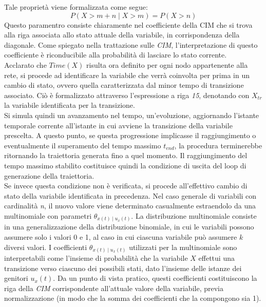   Tale proprietà viene formalizzata come segue:
  \begin{equation}
    P(X > m + n \; | \; X > m) = P(X > n)  
  \end{equation}
  Questo paramentro consiste chiaramente nel coefficiente della CIM che si trova alla
  riga associata allo stato attuale della variabile, in corrispondenza della diagonale.
  Come spiegato nella trattazione sulle \textit{CIM}, l'interpretazione di questo coefficiente è
  riconducibile alla probabilità di lasciare lo stato corrente.\\
  Acclarato che $Time(X)$ risulta ora definito per ogni nodo appartenente alla rete,
  si procede ad identificare la variabile che verrà coinvolta per prima in un cambio di stato, ovvero quella 
  caratterizzata dal minor tempo di transizione associato. Ciò è formalizzato attraverso 
  l'espressione a riga \textit{15}, denotando con $X_{tr}$ la variabile identificata per la transizione.\\
  Si simula quindi un avanzamento nel tempo, un'evoluzione, aggiornando l'istante temporale corrente
  all'istante in cui avviene la transizione della variabile prescelta. A questo punto,
  se questa progressione implicasse il raggiungimento o eventualmente il superamento del tempo massimo
  $t_{end}$, la procedura terminerebbe ritornando la traiettoria generata fino a quel momento.
  Il raggiungimento del tempo massimo stabilito costituisce quindi la condizione di uscita del loop di generazione 
  della traiettoria.\\
  Se invece questa condizione non è verificata, si procede all'effettivo cambio di stato della
  variabile identificata in precedenza. 
  Nel caso generale di variabili con cardinalità \textit{n}, il nuovo valore viene
  determinato casualmente estraendolo da una multinomiale con parametri $\theta_{x(t) \; | \; u_x(t)}$.
  La distribuzione multinomiale consiste in una generalizzazione della distribuzione binomiale, in cui le variabili
  possono assumere solo i valori 0 e 1, al caso in cui ciascuna variabile può assumere $k$ diversi valori.
  I coefficienti $\theta_{x(t) \; | \; u_x(t)}$ utilizzati per la multinomiale sono interpretabili come l'insieme di probabilità
  che la variabile $X$ effettui una transizione verso ciascuno dei possibili stati, dato l'insieme delle istanze dei genitori $u_x(t)$. 
  Da un punto di vista pratico, questi coefficienti costituiscono la riga della \textit{CIM} corrispondente all'attuale valore della variabile,
  previa normalizzazione (in modo che la somma dei coefficienti che la compongono sia 1).\\
